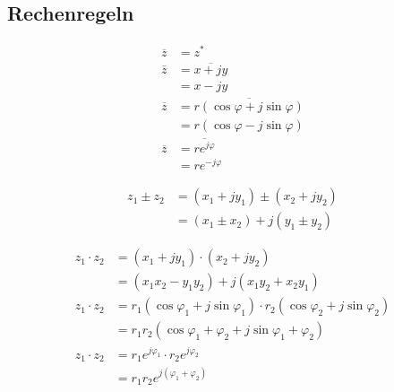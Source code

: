 \subsection{Rechenregeln}

\begin{boxleft}
\end{boxleft}\begin{boxrightshaded}
 \begin{align} 
\overline{z}&=z^*\\
\overline{z}&=\overline{x+jy}\\
&=x-jy\\
\overline{z}&=\overline{r\left(\cos{\varphi}+j\sin{\varphi}\right)}\\
&=r\left(\cos{\varphi}-j\sin{\varphi}\right)\\
\overline{z}&=\overline{re^{j\varphi}}\\
&=re^{-j\varphi}
\end{align}\end{boxrightshaded}

\begin{boxleft}
\end{boxleft}\begin{boxrightshaded}
\begin{align} 
  z_1\pm z_2&=(x_1+jy_1)\pm(x_2+jy_2)\\
	    &=(x_1\pm x_2)+ j(y_1 \pm y_2)
\end{align}\end{boxrightshaded}

\begin{boxleft}
\end{boxleft}\begin{boxrightshaded}
 \begin{align} 
 z_1 \cdot z_2&=(x_1+jy_1)\cdot(x_2+jy_2)\\
	      &=(x_1x_2-y_1y_2)+ j(x_1y_2+x_2y_1)\\
 z_1 \cdot z_2&=r_1\left(\cos{\varphi_1}+j\sin{\varphi_1}\right)\cdot r_2\left(\cos{\varphi_2}+j\sin{\varphi_2}\right)\\
	      &=r_1r_2\left(\cos{\varphi_1+\varphi_2}+j\sin{\varphi_1+\varphi_2}\right)\\
 z_1 \cdot z_2&=r_1e^{j\varphi_1}\cdot r_2e^{j\varphi_2}\\
	      &=r_1r_2e^{j(\varphi_1+\varphi_2)}
\end{align}\end{boxrightshaded}
